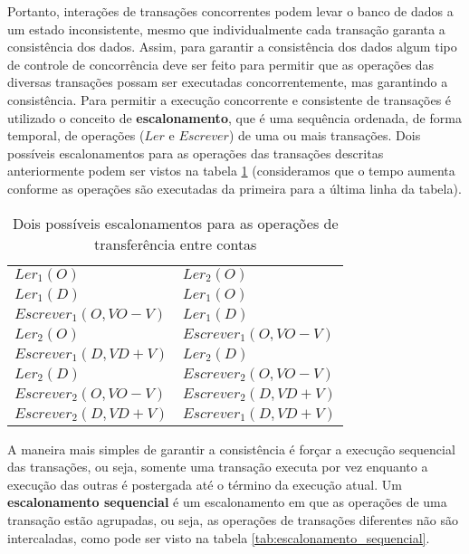 \documentclass[11pt,twoside,a4paper]{book}
\begin{document}
Portanto, interações de transações concorrentes podem levar o banco de dados a um estado inconsistente, mesmo que individualmente cada transação garanta a consistência dos dados. Assim, para garantir a consistência dos dados algum tipo de controle de concorrência deve ser feito para permitir que as operações das diversas transações possam ser executadas concorrentemente, mas garantindo a consistência. Para permitir a execução concorrente e consistente de transações é utilizado o conceito de \textbf{escalonamento}, que é uma sequência ordenada, de forma temporal, de operações ($Ler$ e $Escrever$) de uma ou mais transações. Dois possíveis escalonamentos para as operações das transações descritas anteriormente podem ser vistos na tabela \ref{tab:exemplo_escalonamento} (consideramos que o tempo aumenta conforme as operações são executadas da primeira para a última linha da tabela).

\begin{table}
\caption{Dois possíveis escalonamentos para as operações de transferência entre contas}
\label{tab:exemplo_escalonamento}
\centering
\begin{tabular}{ | l | l | }
	\hline
	$Ler_1(O)$&$Ler_2(O)$\\
	$Ler_1(D)$&$Ler_1(O)$\\
	$Escrever_1(O, VO - V)$&$Ler_1(D)$\\
	$Ler_2(O)$&$Escrever_1(O, VO - V)$\\
	$Escrever_1(D, VD + V)$&$Ler_2(D)$\\
	$Ler_2(D)$&$Escrever_2(O, VO - V)$\\
	$Escrever_2(O, VO - V)$&$Escrever_2(D, VD + V)$\\
	$Escrever_2(D, VD + V)$&$Escrever_1(D, VD + V)$\\
	\hline
\end{tabular}
\end{table}

A maneira mais simples de garantir a consistência é forçar a execução sequencial das transações, ou seja, somente uma transação executa por vez enquanto a execução das outras é postergada até o término da execução atual. Um \textbf{escalonamento sequencial} é um escalonamento em que as operações de uma transação estão agrupadas, ou seja, as operações de transações diferentes não são intercaladas, como pode ser visto na tabela \ref{tab:escalonamento_sequencial}.
\end{document}
